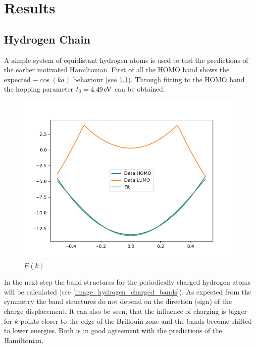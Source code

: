 \chapter{Results}
\section{Hydrogen Chain}

A simple system of equidistant hydrogen atoms is used to test the predictions of the earlier motivated Hamiltonian. First of all the HOMO band shows the expected $-\cos(ka)$ behaviour (see \cref{image_hydrogen_bandstructure}). Through fitting to the HOMO band the hopping parameter $t_0 = \unit[4.49]{eV}$ can be obtained.

\begin{figure}
	\centering
	\includegraphics[width = 12cm]{Images/Hydrogen/hydrogen_bandstructure}
	\caption{$E(k)$}
	\label{image_hydrogen_bandstructure}
\end{figure}

In the next step the band structures for the periodically charged hydrogen atoms will be calculated (see \cref{image_hydrogen_charged_bands}). As expected from the symmetry the band structures do not depend on the direction (sign) of the charge displacement. It can also be seen, that the influence of charging is bigger for $k$-points closer to the edge of the Brillouin zone and the bands become shifted to lower energies. Both is in good agreement with the predictions of the Hamiltonian.

